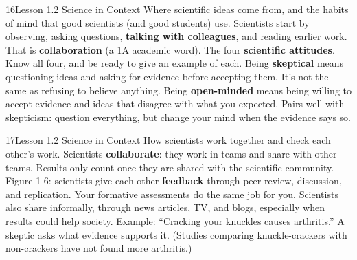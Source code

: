 \documentclass[11pt,letterpaper]{article}
\begin{document}
\begin{tbpage}{16}{Lesson 1.2 Science in Context}
  {Where scientific ideas come from, and the habits of mind that good scientists (and good students) use.}
    {Scientists start by observing, asking questions, \textbf{talking with colleagues}, and reading earlier work. That is \textbf{collaboration} (a 1A academic word).}
    {The four \textbf{scientific attitudes}. Know all four, and be ready to give an example of each.}
    {Being \textbf{skeptical} means questioning ideas and asking for evidence before accepting them. It's not the same as refusing to believe anything.}
    {Being \textbf{open-minded} means being willing to accept evidence and ideas that disagree with what you expected. Pairs well with skepticism: question everything, but change your mind when the evidence says so.}
\end{tbpage}

\begin{tbpage}{17}{Lesson 1.2 Science in Context}
  {How scientists work together and check each other's work.}
    {Scientists \textbf{collaborate}: they work in teams and share with other teams. Results only count once they are shared with the scientific community.}
    {Figure 1-6: scientists give each other \textbf{feedback} through peer review, discussion, and replication. Your formative assessments do the same job for you.}
    {Scientists also share informally, through news articles, TV, and blogs, especially when results could help society.}
    {Example: ``Cracking your knuckles causes arthritis.'' A skeptic asks what evidence supports it. (Studies comparing knuckle-crackers with non-crackers have not found more arthritis.)}
\end{tbpage}
\end{document}
